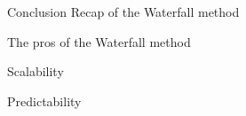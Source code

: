 \begin{frame}{Conclusion}
Recap of the Waterfall method

    \begin{alertblock}{The pros of the Waterfall method}
        \item Scalability
        
        \item Predictability
    \end{alertblock}
\end{frame}

